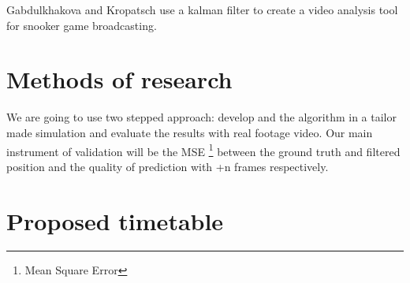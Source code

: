 \documentclass[titlepage, a4paper, 11pt]{scrartcl}
\begin{document}
\begin{multicols}{2}
    Gabdulkhakova and Kropatsch \cite{kropatsch} use a kalman filter to create a video analysis tool for snooker game broadcasting.

    \section{Methods of research}

    We are going to use two stepped approach: develop and the algorithm in a tailor made simulation
    and evaluate the results with real footage video. Our main instrument of validation will be the MSE
    \footnote{Mean Square Error} between the ground truth and filtered position and the quality of prediction
    with +n frames respectively.


    \section{Proposed timetable}

\end{multicols} 

 

\end{document}
